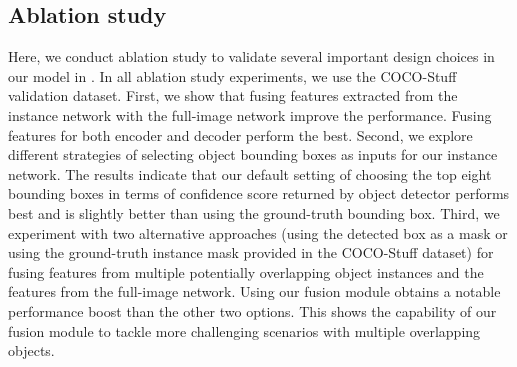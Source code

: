\begin{table*}[t!]
    \hfill
    \begin{subtable}[t]{0.325\textwidth}
        \centering
        \caption{Different Weighted Sum}
        \label{tab:ablation_mask}
    \end{subtable}
\end{table*} 
\subsection{Ablation study}
\label{sec:ablation}
Here, we conduct ablation study to validate several important design choices in our model in .
In all ablation study experiments, we use the COCO-Stuff validation dataset. 
First, we show that fusing features extracted from the instance network with the full-image network improve the performance.
Fusing features for both encoder and decoder perform the best. 
Second, we explore different strategies of selecting object bounding boxes as inputs for our instance network.
The results indicate that our default setting of choosing the top eight bounding boxes in terms of confidence score returned by object detector performs best and is slightly better than using the ground-truth bounding box.  
Third, we experiment with two alternative approaches (using the detected box as a mask or using the ground-truth instance mask provided in the COCO-Stuff dataset) for fusing features from multiple potentially overlapping object instances and the features from the full-image network.
Using our fusion module obtains a notable performance boost than the other two options.
This shows the capability of our fusion module to tackle more challenging scenarios with multiple overlapping objects.

